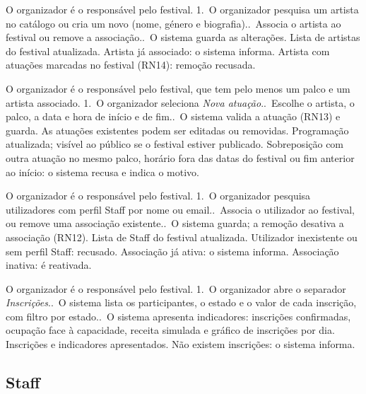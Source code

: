 {O organizador é o responsável pelo festival.}
{1.~O organizador pesquisa um artista no catálogo ou cria um novo (nome,
 género e biografia)..~Associa o artista ao festival ou remove a associação..~O sistema guarda as alterações.}
{Lista de artistas do festival atualizada.}
{Artista já associado: o sistema informa.
 Artista com atuações marcadas no festival (RN14): remoção recusada.}

{O organizador é o responsável pelo festival, que tem pelo menos um palco e um
 artista associado.}
{1.~O organizador seleciona \emph{Nova atuação}..~Escolhe o artista, o palco, a data e hora de início e de fim..~O sistema valida a atuação (RN13) e guarda. As atuações existentes podem
 ser editadas ou removidas.}
{Programação atualizada; visível ao público se o festival estiver publicado.}
{Sobreposição com outra atuação no mesmo palco, horário fora das datas do
 festival ou fim anterior ao início: o sistema recusa e indica o motivo.}

{O organizador é o responsável pelo festival.}
{1.~O organizador pesquisa utilizadores com perfil Staff por nome ou
 email..~Associa o utilizador ao festival, ou remove uma associação existente..~O sistema guarda; a remoção desativa a associação (RN12).}
{Lista de Staff do festival atualizada.}
{Utilizador inexistente ou sem perfil Staff: recusado.
 Associação já ativa: o sistema informa.
 Associação inativa: é reativada.}

{O organizador é o responsável pelo festival.}
{1.~O organizador abre o separador \emph{Inscrições}..~O sistema lista os participantes, o estado e o valor de cada inscrição,
 com filtro por estado..~O sistema apresenta indicadores: inscrições confirmadas, ocupação face à
 capacidade, receita simulada e gráfico de inscrições por dia.}
{Inscrições e indicadores apresentados.}
{Não existem inscrições: o sistema informa.}

\subsection{Staff}

